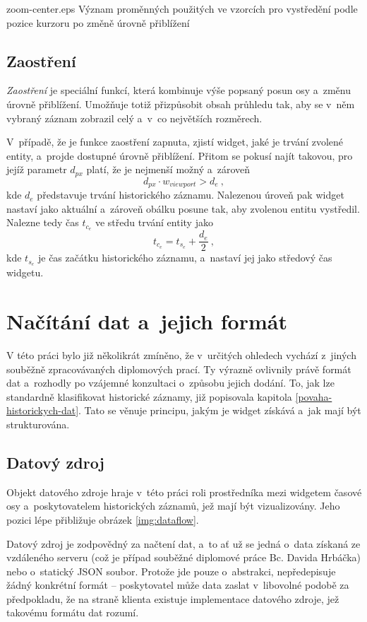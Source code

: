 				
					{}
					{zoom-center.eps}
					{Význam proměnných použitých ve vzorcích pro vystředění podle pozice kurzoru po změně úrovně přiblížení}
					{}
				
			\subsection{Zaostření}
				\label{zaostreni}
				\emph{Zaostření} je speciální funkcí, která kombinuje výše popsaný posun osy a~změnu úrovně přiblížení. Umožňuje totiž přizpůsobit obsah průhledu tak, aby se v~něm vybraný záznam zobrazil celý a~v~co největších rozměrech.
				
			 V~případě, že je funkce zaostření zapnuta, zjistí widget, jaké je trvání zvolené entity, a~projde dostupné úrovně přiblížení. Přitom se pokusí najít takovou, pro jejíž parametr $d_{px}$ platí, že je nejmenší možný a~zároveň
				$$d_{px} \cdot w_{viewport} > d_e\ ,$$
				kde $d_e$ představuje trvání historického záznamu. Nalezenou úroveň pak widget nastaví jako aktuální a~zároveň obálku posune tak, aby zvolenou entitu vystředil. Nalezne tedy čas $t_{c_e}$ ve středu trvání entity jako
				$$t_{c_e} = t_{s_e} + \frac{d_e}{2}\ ,$$
				kde $t_{s_e}$ je čas začátku historického záznamu, a~nastaví jej jako středový čas wid\-getu.
				
		\section{Načítání dat a~jejich formát}
			\label{format-dat}
			V této práci bylo již několikrát zmíněno, že v~určitých ohledech vychází z~jiných souběžně zpracovávaných diplomových prací. Ty výrazně ovlivnily právě formát dat a~rozhodly po vzájemné konzultaci o~způsobu jejich dodání. To, jak lze standardně klasifikovat historické záznamy, již popisovala kapitola \ref{povaha-historickych-dat}. Tato se věnuje principu, jakým je widget získává a~jak mají být strukturována.
			
			\subsection{Datový zdroj}
				\label{datovy-zdroj}
				Objekt datového zdroje hraje v~této práci roli prostředníka mezi widgetem časové osy a~poskytovatelem historických záznamů, jež mají být vizualizovány. Jeho pozici lépe přibližuje obrázek \ref{img:dataflow}.
				
				Datový zdroj je zodpovědný za načtení dat, a~to ať už se jedná o~data získaná ze vzdáleného serveru (což je případ souběžné diplomové práce Bc. Davida Hrbáčka) nebo o~statický JSON soubor. Protože jde pouze o~abstrakci, nepředepisuje žádný konkrétní formát -- poskytovatel může data zaslat v~libovolné podobě za předpokladu, že na straně klienta existuje implementace datového zdroje, jež takovému formátu dat rozumí. 
				
